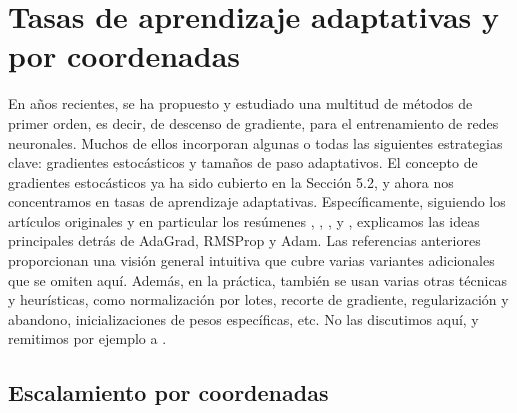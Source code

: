 \documentclass[11pt]{report}
\theoremstyle{definition}
\theoremstyle{plain}
\numberwithin{equation}{section}
\begin{document}
\section{Tasas de aprendizaje adaptativas y por coordenadas}

En años recientes, se ha propuesto y estudiado una multitud de métodos de primer orden, es decir, de descenso de gradiente, para el entrenamiento de redes neuronales. Muchos de ellos incorporan algunas o todas las siguientes estrategias clave: gradientes estocásticos y tamaños de paso adaptativos. El concepto de gradientes estocásticos ya ha sido cubierto en la Sección 5.2, y ahora nos concentramos en tasas de aprendizaje adaptativas. Específicamente, siguiendo los artículos originales \cite{duchi-hazan-singer-2011,kingma-ba-2015,tieleman-hinton-2012,hinton-srivastava-swersky-2012} y en particular los resúmenes \cite{goodfellow-bengio-courville-2016,ruder-2016}, \cite[Capítulo 11]{aggarwal-2018}, \cite[Capítulo 11]{goodfellow-bengio-courville-2016}, y \cite[Sección 8.4]{murphy-2022}, explicamos las ideas principales detrás de AdaGrad, RMSProp y Adam. Las referencias anteriores proporcionan una visión general intuitiva que cubre varias variantes adicionales que se omiten aquí. Además, en la práctica, también se usan varias otras técnicas y heurísticas, como normalización por lotes, recorte de gradiente, regularización y abandono, inicializaciones de pesos específicas, etc. No las discutimos aquí, y remitimos por ejemplo a \cite{bengio-2012,goodfellow-bengio-courville-2016,lecun-bottou-orr-mueller-2002,murphy-2022}.

\subsection{Escalamiento por coordenadas}
\end{document}
